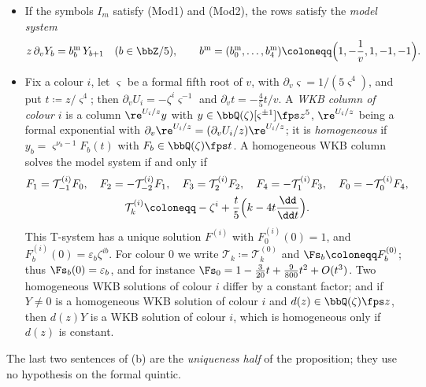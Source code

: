 \begin{prop}
\label{prop:set-modrows}
\begin{itemize}
\item[(a)] If the symbols $I_m$ satisfy (Mod1) and (Mod2), the rows satisfy the \emph{model system}
\[
z\,\partial_vY_b=b^{\mathrm m}_b\,Y_{b+1}\quad(b\in\bbZ/5),\qquad b^{\mathrm m}=(b^{\mathrm m}_0,\dots,b^{\mathrm m}_4)\coloneqq\Bigl(1,-\frac1v,1,-1,-1\Bigr).
\]
\item[(b)] Fix a colour $i$, let $\varsigma$ be a formal fifth root of $v$, with $\partial_v\varsigma=1/(5\varsigma^4)$, and put $t\coloneqq z/\varsigma^4$; then $\partial_vU_i=-\zeta^i\varsigma^{-1}$ and $\partial_vt=-\frac45t/v$. A \emph{WKB column of colour $i$} is a column $\re^{U_i/z}y$ with $y\in\bbQ(\zeta)[\varsigma^{\pm1}]\fps z^5$, $\re^{U_i/z}$ being a formal exponential with $\partial_v\re^{U_i/z}=(\partial_vU_i/z)\re^{U_i/z}$; it is \emph{homogeneous} if $y_b=\varsigma^{\nu_b-1}F_b(t)$ with $F_b\in\bbQ(\zeta)\fps t$. A homogeneous WKB column solves the model system if and only if
\begin{gather*}
F_1=\mathcal T^{(i)}_{-1}F_0,\quad F_2=-\mathcal T^{(i)}_{-2}F_1,\quad F_3=\mathcal T^{(i)}_2F_2,\quad F_4=-\mathcal T^{(i)}_1F_3,\quad F_0=-\mathcal T^{(i)}_0F_4,\\
\mathcal T^{(i)}_k\coloneqq-\zeta^i+\frac t5\Bigl(k-4t\frac{\dd}{\dd t}\Bigr).
\end{gather*}
This T-system has a unique solution $F^{(i)}$ with $F^{(i)}_0(0)=1$, and $F^{(i)}_b(0)=\varepsilon_b\zeta^{ib}$. For colour $0$ we write $\mathcal T_k\coloneqq\mathcal T^{(0)}_k$ and $\Fs_b\coloneqq F^{(0)}_b$; thus $\Fs_b(0)=\varepsilon_b$, and for instance $\Fs_0=1-\frac3{20}t+\frac9{800}t^2+O(t^3)$. Two homogeneous WKB solutions of colour $i$ differ by a constant factor; and if $Y\neq0$ is a homogeneous WKB solution of colour $i$ and $d(z)\in\bbQ(\zeta)\fps z$, then $d(z)Y$ is a WKB solution of colour $i$, which is homogeneous only if $d(z)$ is constant.
\end{itemize}
\end{prop}

The last two sentences of (b) are the \emph{uniqueness half} of the proposition; they use no hypothesis on the formal quintic.

